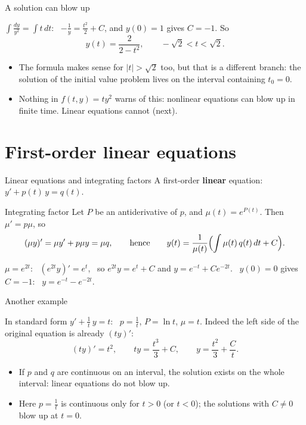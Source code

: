 \documentclass[10pt]{wosm-slides}
\begin{document}
\begin{frame}{A solution can blow up}
  \begin{example}[$y' = t\, y^2$, \ $y(0) = 1$]
    $\displaystyle \int \frac{dy}{y^2} = \int t\, dt$: \ $-\frac1y = \frac{t^2}{2} + C$, and $y(0) = 1$ gives
    $C = -1$. So
    \[ y(t) = \frac{2}{2 - t^2}, \qquad -\sqrt2 < t < \sqrt2 . \]
  \end{example}
  \pause
  \begin{itemize}
    \item The formula makes sense for $|t| > \sqrt2$ too, but that is a different branch: the solution
      of the initial value problem lives on the interval containing $t_0 = 0$.
    \item Nothing in $f(t, y) = ty^2$ warns of this: nonlinear equations can blow up in finite time.
      Linear equations cannot (next).
  \end{itemize}
\end{frame}

\section{First-order linear equations}

\begin{frame}{Linear equations and integrating factors}
  A first-order \textbf{linear} equation: \ $y' + p(t)\, y = q(t)$.
  \pause
  \begin{block}{Integrating factor}
    Let $P$ be an antiderivative of $p$, and $\mu(t) = e^{P(t)}$. Then $\mu' = p\mu$, so
    \[ (\mu y)' = \mu y' + p\mu y = \mu q, \qquad\text{hence}\qquad
       y(t) = \frac{1}{\mu(t)} \Bigl( \int \mu(t)\, q(t)\, dt + C \Bigr) . \]
  \end{block}
  \pause
  \begin{example}[$y' + 2y = e^{-t}$, \ $y(0) = 0$]
    $\mu = e^{2t}$: \ $(e^{2t} y)' = e^{t}$, \ so $e^{2t} y = e^t + C$ and $y = e^{-t} + C e^{-2t}$. \
    $y(0) = 0$ gives $C = -1$: \ $y = e^{-t} - e^{-2t}$.
  \end{example}
\end{frame}

\begin{frame}{Another example}
  \begin{example}[$t\, y' + y = t^2$, \ $t > 0$]
    In standard form $y' + \frac1t\, y = t$: \ $p = \frac1t$, $P = \ln t$, $\mu = t$. Indeed the left side
    of the original equation is already $(ty)'$:
    \[ (ty)' = t^2, \qquad ty = \frac{t^3}{3} + C, \qquad y = \frac{t^2}{3} + \frac Ct . \]
  \end{example}
  \pause
  \begin{itemize}
    \item If $p$ and $q$ are continuous on an interval, the solution exists on the whole interval: linear
      equations do not blow up.
    \item Here $p = \frac1t$ is continuous only for $t > 0$ (or $t < 0$); the solutions with $C \ne 0$ blow up
      at $t = 0$.
  \end{itemize}
\end{frame}
\end{document}
